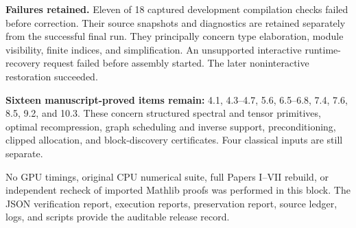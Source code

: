 \textbf{Failures retained.} Eleven of 18 captured development compilation checks failed before correction. Their source snapshots and diagnostics are retained separately from the successful final run. They principally concern type elaboration, module visibility, finite indices, and simplification. An unsupported interactive runtime-recovery request failed before assembly started. The later noninteractive restoration succeeded.

\textbf{Sixteen manuscript-proved items remain:} 4.1, 4.3--4.7, 5.6, 6.5--6.8, 7.4, 7.6, 8.5, 9.2, and 10.3. These concern structured spectral and tensor primitives, optimal recompression, graph scheduling and inverse support, preconditioning, clipped allocation, and block-discovery certificates. Four classical inputs are still separate.

No GPU timings, original CPU numerical suite, full Papers I--VII rebuild, or independent recheck of imported Mathlib proofs was performed in this block. The JSON verification report, execution reports, preservation report, source ledger, logs, and scripts provide the auditable release record.
